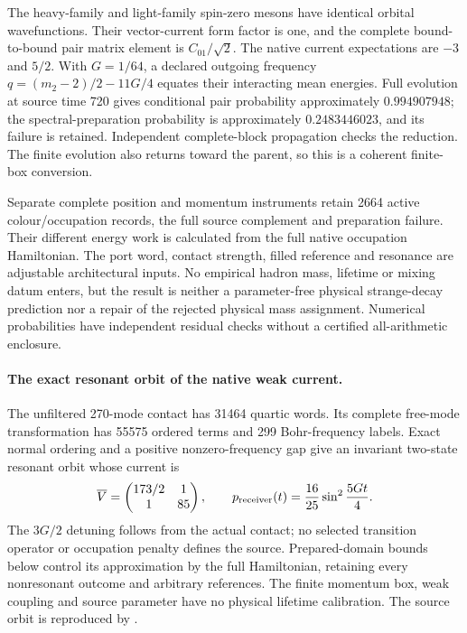 The heavy-family and light-family spin-zero mesons have identical orbital
wavefunctions. Their vector-current form factor is one, and the complete
bound-to-bound pair matrix element is $C_{01}/\sqrt2$. The native current
expectations are $-3$ and $5/2$. With $G=1/64$, a declared outgoing frequency
$q=(m_2-2)/2-11G/4$ equates their interacting mean energies. Full evolution
at source time 720 gives conditional pair probability approximately
$0.994907948$; the spectral-preparation probability is approximately
$0.2483446023$, and its failure is retained. Independent complete-block
propagation checks the reduction. The finite evolution also returns toward
the parent, so this is a coherent finite-box conversion.

Separate complete position and momentum instruments retain 2664 active
colour/occupation records, the full source complement and preparation
failure. Their different energy work is calculated from the full native
occupation Hamiltonian. The port word, contact strength, filled reference
and resonance are adjustable architectural inputs. No empirical hadron
mass, lifetime or mixing datum enters, but the result is neither a
parameter-free physical strange-decay prediction nor a repair of the
rejected physical mass assignment. Numerical probabilities have independent
residual checks without a certified all-arithmetic enclosure.



\paragraph{The exact resonant orbit of the native weak current.}
The unfiltered 270-mode contact has 31464 quartic words. Its complete
free-mode transformation has 55575 ordered terms and 299 Bohr-frequency
labels. Exact normal ordering and a positive nonzero-frequency gap give
an invariant two-state resonant orbit whose current is
\[
 \overline V=\begin{pmatrix}173/2&1\\1&85\end{pmatrix},
 \qquad p_{\rm receiver}(t)=\frac{16}{25}\sin^2\frac{5Gt}{4}.
\]
The $3G/2$ detuning follows from the actual contact; no selected transition
operator or occupation penalty defines the source. Prepared-domain bounds
below control its approximation by the full Hamiltonian, retaining every
nonresonant outcome and arbitrary references. The finite momentum box,
weak coupling and source parameter have no physical lifetime calibration.
The source orbit is reproduced by .


